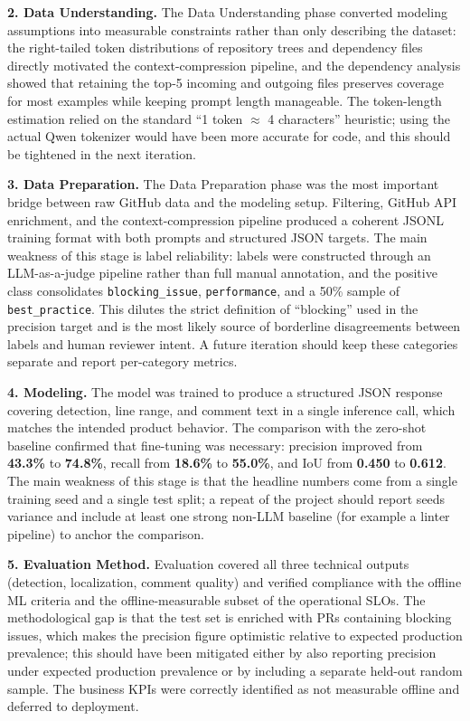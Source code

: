 \documentclass[11pt]{article}
\begin{document}
\textbf{2. Data Understanding.}
The Data Understanding phase converted modeling assumptions into measurable constraints rather than only describing the dataset: the right-tailed token distributions of repository trees and dependency files directly motivated the context-compression pipeline, and the dependency analysis showed that retaining the top-5 incoming and outgoing files preserves coverage for most examples while keeping prompt length manageable. The token-length estimation relied on the standard ``1 token $\approx$ 4 characters'' heuristic; using the actual Qwen tokenizer would have been more accurate for code, and this should be tightened in the next iteration.

\textbf{3. Data Preparation.}
The Data Preparation phase was the most important bridge between raw GitHub data and the modeling setup. Filtering, GitHub API enrichment, and the context-compression pipeline produced a coherent JSONL training format with both prompts and structured JSON targets. The main weakness of this stage is label reliability: labels were constructed through an LLM-as-a-judge pipeline rather than full manual annotation, and the positive class consolidates \texttt{blocking\_issue}, \texttt{performance}, and a 50\% sample of \texttt{best\_practice}. This dilutes the strict definition of ``blocking'' used in the precision target and is the most likely source of borderline disagreements between labels and human reviewer intent. A future iteration should keep these categories separate and report per-category metrics.

\textbf{4. Modeling.}
The model was trained to produce a structured JSON response covering detection, line range, and comment text in a single inference call, which matches the intended product behavior. The comparison with the zero-shot baseline confirmed that fine-tuning was necessary: precision improved from \textbf{43.3\%} to \textbf{74.8\%}, recall from \textbf{18.6\%} to \textbf{55.0\%}, and IoU from \textbf{0.450} to \textbf{0.612}. The main weakness of this stage is that the headline numbers come from a single training seed and a single test split; a repeat of the project should report seeds variance and include at least one strong non-LLM baseline (for example a linter pipeline) to anchor the comparison.

\textbf{5. Evaluation Method.}
Evaluation covered all three technical outputs (detection, localization, comment quality) and verified compliance with the offline ML criteria and the offline-measurable subset of the operational SLOs. The methodological gap is that the test set is enriched with PRs containing blocking issues, which makes the precision figure optimistic relative to expected production prevalence; this should have been mitigated either by also reporting precision under expected production prevalence or by including a separate held-out random sample. The business KPIs were correctly identified as not measurable offline and deferred to deployment.
\end{document}
